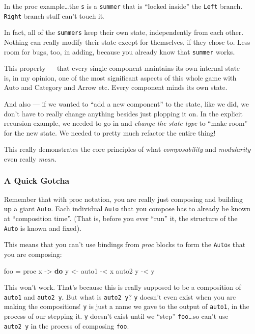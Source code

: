 \documentclass[]{article}
\newenvironment{Shaded}{}{}
\newcommand{\FunctionTok}[1]{\textcolor[rgb]{0.02,0.16,0.49}{#1}}
\newcommand{\KeywordTok}[1]{\textcolor[rgb]{0.00,0.44,0.13}{\textbf{#1}}}
\newcommand{\NormalTok}[1]{#1}
\newcommand{\OtherTok}[1]{\textcolor[rgb]{0.00,0.44,0.13}{#1}}
\begin{document}
In the proc example\ldots{}the \texttt{s} is a \texttt{summer} that is ``locked
inside'' the \texttt{Left} branch. \texttt{Right} branch stuff can't touch it.

In fact, all of the \texttt{summers} keep their own state, independently from
each other. Nothing can really modify their state except for themselves, if they
chose to. Less room for bugs, too, in adding, because you already know that
\texttt{summer} works.

This property --- that every single component maintains its own internal state
--- is, in my opinion, one of the most significant aspects of this whole game
with Auto and Category and Arrow etc. Every component minds its own state.

And also --- if we wanted to ``add a new component'' to the state, like we did,
we don't have to really change anything besides just plopping it on. In the
explicit recursion example, we needed to go in and \emph{change the state type}
to ``make room'' for the new state. We needed to pretty much refactor the entire
thing!

This really demonstrates the core principles of what \emph{composability} and
\emph{modularity} even really \emph{mean}.

\hypertarget{a-quick-gotcha}{%
\subsubsection{A Quick Gotcha}\label{a-quick-gotcha}}

Remember that with proc notation, you are really just composing and building up
a giant \texttt{Auto}. Each individual \texttt{Auto} that you compose has to
already be known at ``composition time''. (That is, before you ever ``run'' it,
the structure of the \texttt{Auto} is known and fixed).

This means that you can't use bindings from \emph{proc} blocks to form the
\texttt{Auto}s that you are composing:

\begin{Shaded}
\begin{Highlighting}[]
\NormalTok{foo }\FunctionTok{=}\NormalTok{ proc x }\OtherTok{->} \KeywordTok{do}
\NormalTok{    y }\OtherTok{<-}\NormalTok{ auto1 }\FunctionTok{-<}\NormalTok{ x}
\NormalTok{    auto2 y }\FunctionTok{-<}\NormalTok{ y}
\end{Highlighting}
\end{Shaded}

This won't work. That's because this is really supposed to be a composition of
\texttt{auto1} and \texttt{auto2\ y}. But what is \texttt{auto2\ y}? \texttt{y}
doesn't even exist when you are making the compositions! \texttt{y} is just a
name we gave to the output of \texttt{auto1}, in the process of our stepping it.
\texttt{y} doesn't exist until we ``step'' \texttt{foo}\ldots{}so can't use
\texttt{auto2\ y} in the process of composing \texttt{foo}.
\end{document}
